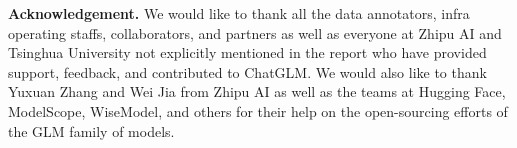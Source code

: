 \documentclass{article}
\newcommand{\vpara}[1]{\vspace{0.07in}\noindent\textbf{#1}\xspace} %
\begin{document}






\vpara{Acknowledgement.} 
We would like to thank all the data annotators, infra operating staffs, collaborators, and partners as well as everyone at Zhipu AI and Tsinghua University not explicitly mentioned in the report who have provided support, feedback, and contributed to ChatGLM. 
We would also like to thank Yuxuan Zhang and Wei Jia from Zhipu AI as well as the teams at Hugging Face, ModelScope, WiseModel, and others for their help on the open-sourcing efforts of the GLM family of models.



\end{document}

